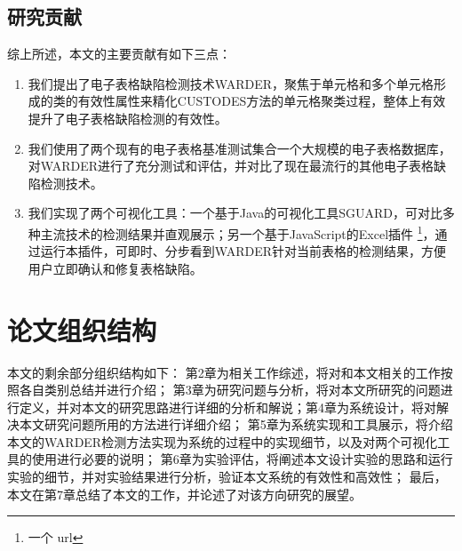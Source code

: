 \subsection{研究贡献}

综上所述，本文的主要贡献有如下三点：

\begin{enumerate}
    \item 我们提出了电子表格缺陷检测技术WARDER，聚焦于单元格和多个单元格形成的类的有效性属性来精化CUSTODES方法的单元格聚类过程，整体上有效提升了电子表格缺陷检测的有效性。
    \item 我们使用了两个现有的电子表格基准测试集合一个大规模的电子表格数据库，对WARDER进行了充分测试和评估，并对比了现在最流行的其他电子表格缺陷检测技术。
    \item 我们实现了两个可视化工具：一个基于Java的可视化工具SGUARD\cite{li2019sguard}，可对比多种主流技术的检测结果并直观展示；另一个基于JavaScript的Excel插件 \footnote{一个 url}，通过运行本插件，可即时、分步看到WARDER针对当前表格的检测结果，方便用户立即确认和修复表格缺陷。
\end{enumerate}

\section{论文组织结构}

本文的剩余部分组织结构如下：
第2章为相关工作综述，将对和本文相关的工作按照各自类别总结并进行介绍；
第3章为研究问题与分析，将对本文所研究的问题进行定义，并对本文的研究思路进行详细的分析和解说；第4章为系统设计，将对解决本文研究问题所用的方法进行详细介绍；
第5章为系统实现和工具展示，将介绍本文的WARDER检测方法实现为系统的过程中的实现细节，以及对两个可视化工具的使用进行必要的说明；
第6章为实验评估，将阐述本文设计实验的思路和运行实验的细节，并对实验结果进行分析，验证本文系统的有效性和高效性；
最后，本文在第7章总结了本文的工作，并论述了对该方向研究的展望。